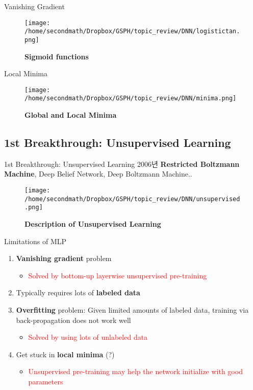 \documentclass{beamer}
\begin{document}
\begin{frame}{Vanishing Gradient\citep{bengio1994learning}}
\begin{figure}[!ht]
\centering
\texttt{[image: /home/secondmath/Dropbox/GSPH/topic\_review/DNN/logistictan.png]}
\caption{\bf{Sigmoid functions}}
\end{figure}
\end{frame}

\begin{frame}{Local Minima\citep{kimjunmoppt}}
\begin{figure}[!ht]
\centering
\texttt{[image: /home/secondmath/Dropbox/GSPH/topic\_review/DNN/minima.png]}
\caption{\bf{Global and Local Minima}}
\label{minima}
\end{figure}
\end{frame}




\subsection{1st Breakthrough: Unsupervised Learning}
\begin{frame}{1st Breakthrough: Unsupervised Learning}
2006년 \textbf{Restricted Boltzmann Machine}, Deep Belief Network, Deep Boltzmann Machine\citep{smolensky1986information,hinton2006reducing}..
\begin{figure}[!ht]
\centering
\texttt{[image: /home/secondmath/Dropbox/GSPH/topic\_review/DNN/unsupervised.png]}
\label{unsupervised}
\caption{\bf{Description of Unsupervised Learning}\citep{kimjunmoppt}}
\end{figure}
\end{frame}


\begin{frame}{Limitations of MLP\citep{kimjunmoppt}}
\begin{enumerate}
\item \textbf{Vanishing gradient} problem
\begin{itemize}
  \item \textcolor{red}{Solved by bottom-up layerwise unsupervised pre-training}
\end{itemize}
\item Typically requires lots of \textbf{labeled data}
\item \textbf{Overfitting} problem: Given limited amounts of labeled data, training via back-propagation does not work well
\begin{itemize}
  \item \textcolor{red}{Solved by using lots of unlabeled data}
\end{itemize}
\item Get stuck in \textbf{local minima} (?)
\begin{itemize}
  \item \textcolor{red}{Unsupervised pre-training may help the network initialize with good parameters}
\end{itemize}
\end{enumerate} 
\end{frame}
\end{document}

